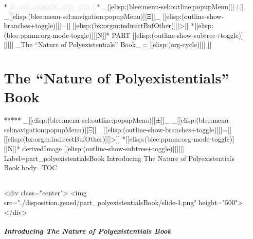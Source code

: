 \begin{whenOrg}
\begin{whenOrg}
*      ================
*  _[[elisp:(blee:menu-sel:outline:popupMenu)][±]]_ _[[elisp:(blee:menu-sel:navigation:popupMenu)][Ξ]]_ [[elisp:(outline-show-branches+toggle)][|=]] [[elisp:(bx:orgm:indirectBufOther)][|>]] *[[elisp:(blee:ppmm:org-mode-toggle)][|N]]*  PART       [[elisp:(outline-show-subtree+toggle)][||]]   _The ``Nature of Polyexistentials'' Book_ ::  [[elisp:(org-cycle)][| ]]
\end{whenOrg}

\newpage
\part{The ``Nature of Polyexistentials'' Book}

\begin{whenOrg}
*****  _[[elisp:(blee:menu-sel:outline:popupMenu)][±]]_ _[[elisp:(blee:menu-sel:navigation:popupMenu)][Ξ]]_ [[elisp:(outline-show-branches+toggle)][|=]] [[elisp:(bx:orgm:indirectBufOther)][|>]] *[[elisp:(blee:ppmm:org-mode-toggle)][|N]]*  derivedImage [[elisp:(outline-show-subtree+toggle)][||]] Label=part_polyexistentialsBook Introducing The Nature of Polyexistentials Book body=TOC
\end{whenOrg}

\begin{htmlonly}

\begin{frame}[fragile,plain,label=part_polyexistentialsBook]
    \frametitle{}
    \framesubtitle{}
    \begin{rawhtml}
<div class="center">
<img src="./disposition.gened/part_polyexistentialsBook/slide-1.png" height="500">
</div>
    \end{rawhtml}
\end{frame}
\end{htmlonly}

\begin{verblatex}

\begin{frame}[fragile,label=part_polyexistentialsBook]
    \frametitle{Introducing The Nature of Polyexistentials Book}
    \framesubtitle{}


\end{frame}
\end{verblatex}
\end{whenOrg}
